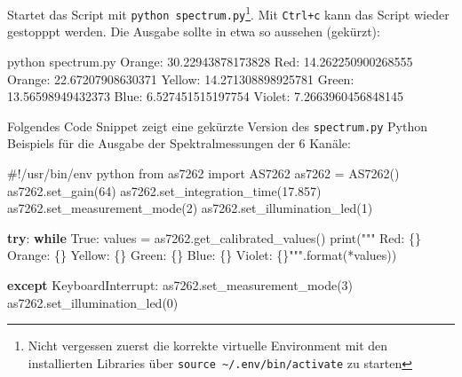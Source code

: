 \documentclass[
  11pt,
  a4paperpaper,
  oneside, openany  ,captions=tableheading
]{scrbook}
\newenvironment{Shaded}{\begin{snugshade}}{\end{snugshade}}
\newcommand{\BuiltInTok}[1]{\textcolor[rgb]{0.00,0.23,0.31}{#1}}
\newcommand{\CommentTok}[1]{\textcolor[rgb]{0.37,0.37,0.37}{#1}}
\newcommand{\ControlFlowTok}[1]{\textcolor[rgb]{0.00,0.23,0.31}{\textbf{#1}}}
\newcommand{\DecValTok}[1]{\textcolor[rgb]{0.68,0.00,0.00}{#1}}
\newcommand{\ExtensionTok}[1]{\textcolor[rgb]{0.00,0.23,0.31}{#1}}
\newcommand{\FloatTok}[1]{\textcolor[rgb]{0.68,0.00,0.00}{#1}}
\newcommand{\ImportTok}[1]{\textcolor[rgb]{0.00,0.46,0.62}{#1}}
\newcommand{\NormalTok}[1]{\textcolor[rgb]{0.00,0.23,0.31}{#1}}
\newcommand{\OperatorTok}[1]{\textcolor[rgb]{0.37,0.37,0.37}{#1}}
\newcommand{\PreprocessorTok}[1]{\textcolor[rgb]{0.68,0.00,0.00}{#1}}
\newcommand{\SpecialCharTok}[1]{\textcolor[rgb]{0.37,0.37,0.37}{#1}}
\newcommand{\StringTok}[1]{\textcolor[rgb]{0.13,0.47,0.30}{#1}}
\newcommand{\VariableTok}[1]{\textcolor[rgb]{0.07,0.07,0.07}{#1}}
\theoremstyle{definition}
\theoremstyle{remark}
\newcommand*\circled[1]{\tikz[baseline=(char.base)]{
          \node[shape=circle,draw,inner sep=1pt] (char) {{\scriptsize#1}};}}
\begin{document}
Startet das Script mit \texttt{python\ spectrum.py}\footnote{Nicht
  vergessen zuerst die korrekte virtuelle Environment mit den
  installierten Libraries über
  \texttt{source\ \textasciitilde{}/.env/bin/activate} zu starten}. Mit
\texttt{Ctrl+c} kann das Script wieder gestopppt werden. Die Ausgabe
sollte in etwa so aussehen (gekürzt):

\begin{Shaded}
\begin{Highlighting}[]
\ExtensionTok{python}\NormalTok{ spectrum.py}
\ExtensionTok{Orange:}\NormalTok{ 30.22943878173828}
\ExtensionTok{Red:}\NormalTok{    14.262250900268555}
\ExtensionTok{Orange:}\NormalTok{ 22.67207908630371}
\ExtensionTok{Yellow:}\NormalTok{ 14.271308898925781}
\ExtensionTok{Green:}\NormalTok{  13.56598949432373}
\ExtensionTok{Blue:}\NormalTok{   6.527451515197754}
\ExtensionTok{Violet:}\NormalTok{ 7.2663960456848145}
\end{Highlighting}
\end{Shaded}

Folgendes Code Snippet zeigt eine gekürzte Version des
\texttt{spectrum.py} Python Beispiels für die Ausgabe der
Spektralmessungen der 6 Kanäle:

\label{annotated-cell-15}%
\begin{Shaded}
\begin{Highlighting}[]
\CommentTok{\#!/usr/bin/env python}
\ImportTok{from}\NormalTok{ as7262 }\ImportTok{import}\NormalTok{ AS7262}
\NormalTok{as7262 }\OperatorTok{=}\NormalTok{ AS7262()}
\NormalTok{as7262.set\_gain(}\DecValTok{64}\NormalTok{) }\hspace*{\fill}\NormalTok{\circled{1}}
\NormalTok{as7262.set\_integration\_time(}\FloatTok{17.857}\NormalTok{) }
\NormalTok{as7262.set\_measurement\_mode(}\DecValTok{2}\NormalTok{) }
\NormalTok{as7262.set\_illumination\_led(}\DecValTok{1}\NormalTok{) }

\ControlFlowTok{try}\NormalTok{:}
    \ControlFlowTok{while} \VariableTok{True}\NormalTok{:}
\NormalTok{        values }\OperatorTok{=}\NormalTok{ as7262.get\_calibrated\_values() }\hspace*{\fill}\NormalTok{\circled{2}}
        \BuiltInTok{print}\NormalTok{(}\StringTok{"""}
\StringTok{Red:    }\SpecialCharTok{\{\}}
\StringTok{Orange: }\SpecialCharTok{\{\}}
\StringTok{Yellow: }\SpecialCharTok{\{\}}
\StringTok{Green:  }\SpecialCharTok{\{\}}
\StringTok{Blue:   }\SpecialCharTok{\{\}}
\StringTok{Violet: }\SpecialCharTok{\{\}}\StringTok{"""}\NormalTok{.}\BuiltInTok{format}\NormalTok{(}\OperatorTok{*}\NormalTok{values))}

\ControlFlowTok{except} \PreprocessorTok{KeyboardInterrupt}\NormalTok{:}
\NormalTok{    as7262.set\_measurement\_mode(}\DecValTok{3}\NormalTok{)}
\NormalTok{    as7262.set\_illumination\_led(}\DecValTok{0}\NormalTok{)}
\end{Highlighting}
\end{Shaded}
\end{document}
